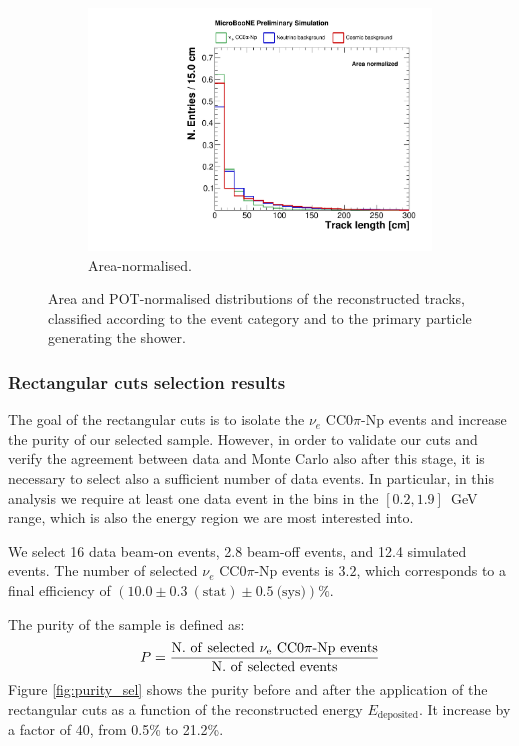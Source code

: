 \begin{figure}[htbp]
\begin{subfigure}{0.49\textwidth}
    \includegraphics[width=\linewidth]{figures/h_track_length_norm.pdf}
    \caption{Area-normalised.} \label{fig:length_norm}
  \end{subfigure}
  \caption{Area and POT-normalised distributions of the reconstructed tracks, classified according to the event category and to the primary particle generating the shower.}
\end{figure}

\subsubsection*{Rectangular cuts selection results}
The goal of the rectangular cuts is to isolate the $\nu_e$ CC0$\pi$-Np events and increase the purity of our selected sample. However, in order to validate our cuts and verify the agreement between data and Monte Carlo also after this stage, it is necessary to select also a sufficient number of data events. In particular, in this analysis we require at least one data event in the bins in the $[0.2,1.9]$~GeV range, which is also the energy region we are most interested into. 


We select 16 data beam-on events, 2.8 beam-off events, and 12.4 simulated events. The number of selected $\nu_e$ CC0$\pi$-Np events is $3.2$, which corresponds to a final efficiency of $(10.0\pm0.3~\mathrm{(stat)}\pm0.5~\text{(sys)})\%$. 

The purity of the sample is defined as:
\begin{equation}
P = \frac{\mathrm{N.~of~selected~\nu_e~CC0}\pi\mathrm{{\text -}Np~events}}{\mathrm{N.~of~selected~events}}
\end{equation}
Figure \ref{fig:purity_sel} shows the purity before and after the application of the rectangular cuts as a function of the reconstructed energy $E_{\mathrm{deposited}}$. It increase by a factor of 40, from 0.5\% to 21.2\%.

